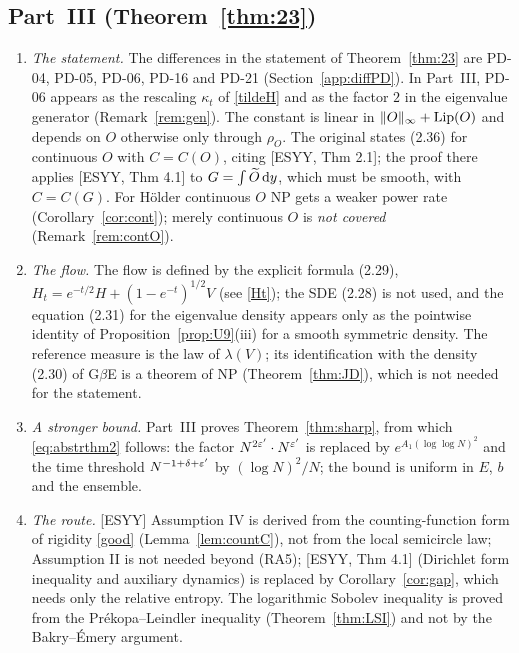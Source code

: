 \subsection{Part~III (Theorem~\ref{thm:23})}\label{sec:diff}
\begin{enumerate}[leftmargin=1.8em,itemsep=2pt,label=\textbf{III.\arabic*.}]
\item \emph{The statement.} The differences in the statement of Theorem~\ref{thm:23} are PD-04, PD-05, PD-06, PD-16 and PD-21 (Section~\ref{app:diffPD}). In Part~III, PD-06 appears as the rescaling $\kappa_t$ of \eqref{tildeH}
and as the factor $2$ in the eigenvalue generator (Remark~\ref{rem:gen}). The constant is linear in $\|O\|_\infty+\operatorname{Lip}(O)$ and depends on $O$ otherwise only through $\rho_O$.
The original states (2.36) for continuous $O$ with $C=C(O)$, citing [ESYY, Thm 2.1]; the proof there applies [ESYY, Thm 4.1] to $G=\int\widetilde O\,\mathrm{d} y$, which must be smooth, with $C=C(G)$.
For H\"older continuous $O$ NP gets a weaker power rate (Corollary~\ref{cor:cont}); merely continuous $O$ is \emph{not covered} (Remark~\ref{rem:contO}).
\item \emph{The flow.} The flow is defined by the explicit formula (2.29), $H_t=e^{-t/2}H+(1-e^{-t})^{1/2}V$ (see \eqref{Ht}); the SDE (2.28) is not used, and the equation (2.31) for the eigenvalue density appears only as the pointwise identity
of Proposition~\ref{prop:U9}(iii) for a smooth symmetric density. The reference measure is the law of $\lambda(V)$; its identification with the density (2.30) of G$\beta$E is a theorem of NP (Theorem~\ref{thm:JD}), which is not needed for the statement.
\item \emph{A stronger bound.} Part~III proves Theorem~\ref{thm:sharp}, from which \eqref{eq:abstrthm2} follows: the factor $N^{2\varepsilon'}\cdot N^{\varepsilon'}$ is replaced by $e^{A_1(\log\log N)^2}$ and the time threshold
$N^{-1+\delta+\varepsilon'}$ by $(\log N)^2/N$; the bound is uniform in $E$, $b$ and the ensemble.
\item \emph{The route.} [ESYY] Assumption IV is derived from the counting-function form of rigidity \eqref{good} (Lemma~\ref{lem:countC}), not from the local semicircle law; Assumption II is not needed beyond (RA5);
[ESYY, Thm 4.1] (Dirichlet form inequality and auxiliary dynamics) is replaced by Corollary~\ref{cor:gap}, which needs only the relative entropy. The logarithmic Sobolev inequality is proved from the Pr\'ekopa--Leindler
inequality (Theorem~\ref{thm:LSI}) and not by the Bakry--\'Emery argument.
\end{enumerate}

